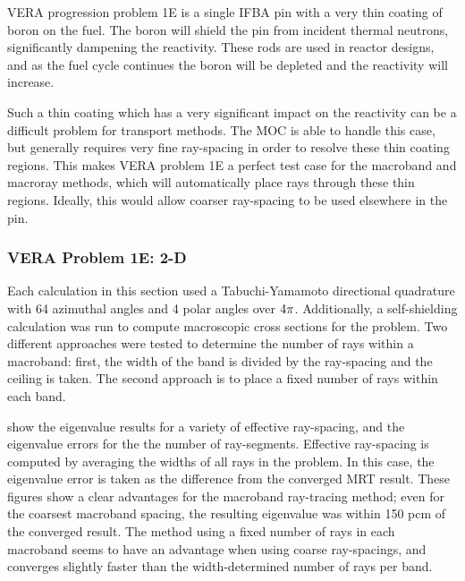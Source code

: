 {{{      \ac{VERA} progression problem 1E \cite{VERAProblems} is a single \ac{IFBA} pin with a very thin coating of boron on the fuel.
      The boron will shield the pin from incident thermal neutrons, significantly dampening the reactivity.
      These rods are used in reactor designs, and as the fuel cycle continues the boron will be depleted and the reactivity will increase.

      Such a thin coating which has a very significant impact on the reactivity can be a difficult problem for transport methods.
      The \ac{MOC} is able to handle this case, but generally requires very fine ray-spacing in order to resolve these thin coating regions.
      This makes \ac{VERA} problem 1E a perfect test case for the macroband and macroray methods, which will automatically place rays through these thin regions.
      Ideally, this would allow coarser ray-spacing to be used elsewhere in the pin.

      \subsubsection{VERA Problem 1E: 2-D}{\label{sssec:MR:1E:2-D}
        Each calculation in this section used a Tabuchi-Yamamoto \cite{TabuchiYamamotoQuad} directional quadrature with 64 azimuthal angles and 4 polar angles over $4\pi$.
        Additionally, a self-shielding calculation was run to compute macroscopic cross sections for the problem.
        Two different approaches were tested to determine the number of rays within a macroband: first, the width of the band is divided by the ray-spacing and the ceiling is taken.
        The second approach is to place a fixed number of rays within each band.

         show the eigenvalue results for a variety of effective ray-spacing, and the eigenvalue errors for the the number of ray-segments.
        Effective ray-spacing is computed by averaging the widths of all rays in the problem.
        In this case, the eigenvalue error is taken as the difference from the converged \ac{MRT} result.
        These figures show a clear advantages for the macroband ray-tracing method;
          even for the coarsest macroband spacing, the resulting eigenvalue was within 150 pcm of the converged result.
        The method using a fixed number of rays in each macroband seems to have an advantage when using coarse ray-spacings, and converges slightly faster than the width-determined number of rays per band.

}}}}
